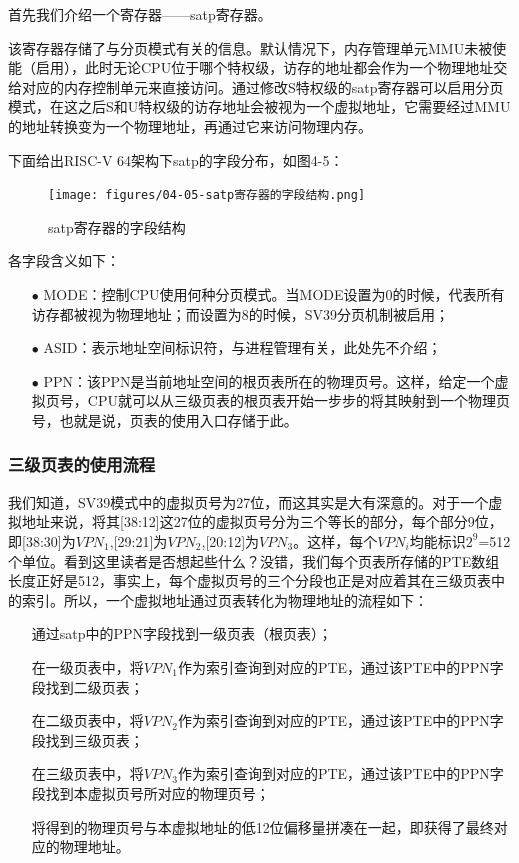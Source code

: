 首先我们介绍一个寄存器——satp寄存器。

该寄存器存储了与分页模式有关的信息。默认情况下，内存管理单元MMU未被使能（启用），此时无论CPU位于哪个特权级，访存的地址都会作为一个物理地址交给对应的内存控制单元来直接访问。通过修改S特权级的satp寄存器可以启用分页模式，在这之后S和U特权级的访存地址会被视为一个虚拟地址，它需要经过MMU的地址转换变为一个物理地址，再通过它来访问物理内存。

下面给出RISC-V 64架构下satp的字段分布，如图4-5：

\begin{figure}[h]
	\centering
	\texttt{[image: figures/04-05-satp寄存器的字段结构.png]}
	\caption{satp寄存器的字段结构}
\end{figure}\FloatBarrier

各字段含义如下：

\begin{itemize}
	\item [$\bullet$]
	MODE：控制CPU使用何种分页模式。当MODE设置为0的时候，代表所有访存都被视为物理地址；而设置为8的时候，SV39分页机制被启用；
	\item [$\bullet$]
	ASID：表示地址空间标识符，与进程管理有关，此处先不介绍；
	\item [$\bullet$]
	PPN：该PPN是当前地址空间的根页表所在的物理页号。这样，给定一个虚拟页号，CPU就可以从三级页表的根页表开始一步步的将其映射到一个物理页号，也就是说，页表的使用入口存储于此。
\end{itemize}

\subsubsection{三级页表的使用流程}

我们知道，SV39模式中的虚拟页号为27位，而这其实是大有深意的。对于一个虚拟地址来说，将其[38:12]这27位的虚拟页号分为三个等长的部分，每个部分9位，即[38:30]为$VPN_{1}$,[29:21]为$VPN_{2}$,[20:12]为$VPN_{3}$。这样，每个$VPN_{i}$均能标识$2^{9}$=512个单位。看到这里读者是否想起些什么？没错，我们每个页表所存储的PTE数组长度正好是512，事实上，每个虚拟页号的三个分段也正是对应着其在三级页表中的索引。所以，一个虚拟地址通过页表转化为物理地址的流程如下：

\begin{itemize}
	\item [\ding{192}]
	通过satp中的PPN字段找到一级页表（根页表）；
	\item [\ding{193}]
	在一级页表中，将$VPN_{1}$作为索引查询到对应的PTE，通过该PTE中的PPN字段找到二级页表；
	\item [\ding{194}]
	在二级页表中，将$VPN_{2}$作为索引查询到对应的PTE，通过该PTE中的PPN字段找到三级页表；
	\item [\ding{195}]
	在三级页表中，将$VPN_{3}$作为索引查询到对应的PTE，通过该PTE中的PPN字段找到本虚拟页号所对应的物理页号；
	\item [\ding{196}]
	将得到的物理页号与本虚拟地址的低12位偏移量拼凑在一起，即获得了最终对应的物理地址。
\end{itemize}

